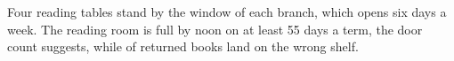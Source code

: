 Four reading tables stand by the window of each branch, which opens six days a week.
The reading room is full by noon on at least 55 days a term, the door count suggests, while  of returned books land on the wrong shelf.
